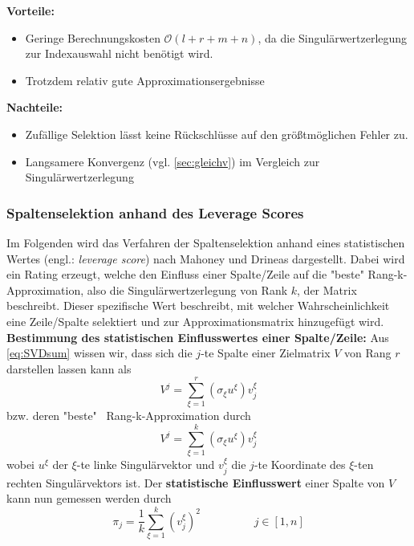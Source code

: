 \documentclass[12pt,a4paper,twoside]{article}
\begin{document}
		\textbf{Vorteile:}
		\begin{itemize}
		\item Geringe Berechnungskosten $\mathcal{O}(l+r+m+n)$, da die Singulärwertzerlegung zur Indexauswahl nicht benötigt wird.
		\item Trotzdem relativ gute Approximationsergebnisse
		\end{itemize}
		\textbf{Nachteile:}
		\begin{itemize}
		\item Zufällige Selektion lässt keine Rückschlüsse auf den größtmöglichen Fehler zu.
		\item Langsamere Konvergenz (vgl. \ref{sec:gleichv}) im Vergleich zur Singulärwertzerlegung
		\end{itemize}
		\subsubsection{Spaltenselektion anhand des Leverage Scores}
		Im Folgenden wird das Verfahren der Spaltenselektion anhand eines statistischen Wertes (engl.: 
		\textit{leverage score}) nach Mahoney und Drineas \citep{mahoney2008} dargestellt. Dabei wird ein Rating erzeugt, welche den 
		Einfluss einer Spalte/Zeile auf die "beste" Rang-k-Approximation, also die Singulärwertzerlegung von Rank $k$, der Matrix beschreibt. Dieser spezifische Wert beschreibt, mit welcher Wahrscheinlichkeit eine Zeile/Spalte selektiert und zur Approximationsmatrix hinzugefügt wird. \newline
		\newline	
		\textbf{Bestimmung des statistischen Einflusswertes einer Spalte/Zeile:} \newline 
		Aus \ref{eq:SVDsum} wissen wir, dass sich die $j$-te Spalte einer Zielmatrix $V$ von Rang $r$ darstellen lassen kann als
		\begin{equation*}
			V^j=\sum_{\xi=1}^r(\sigma_\xi u^\xi )v_j^\xi
		\end{equation*}
		bzw. deren "beste" \ Rang-k-Approximation durch
		\begin{equation*}
			V^j=\sum_{\xi=1}^k(\sigma_\xi u^\xi )v_j^\xi
		\end{equation*}
		wobei $u^\xi$ der $\xi$-te linke Singulärvektor und $v_j^\xi$ die $j$-te Koordinate des $\xi$-ten rechten 
		Singulärvektors ist. Der \textbf{statistische Einflusswert} einer Spalte von $V$ kann nun gemessen werden durch
		\begin{equation}
			\label{eq:score}
			\pi_j=\frac{1}{k}\sum_{\xi=1}^k(v_j^\xi)^2 \hspace{2cm} j\in [1,n]
		\end{equation}
\end{document}
